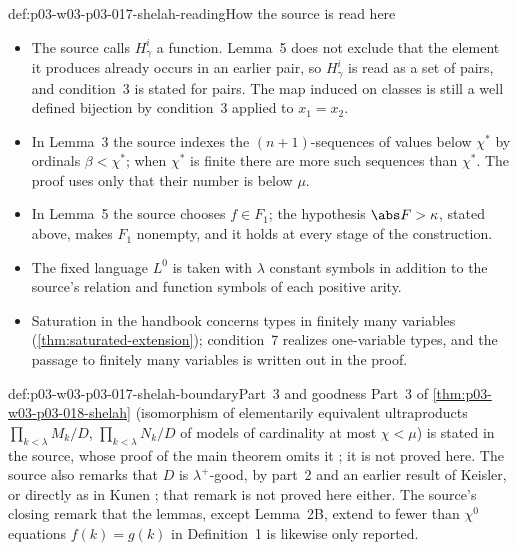 \begin{hbwarning}{def:p03-w03-p03-017-shelah-reading}{How the source is read here}
\begin{itemize}
  \item The source calls \(H^i_\gamma\) a function.  Lemma~5 does not
        exclude that the element it produces already occurs in an earlier
        pair, so \(H^i_\gamma\) is read as a set of pairs, and condition~3
        is stated for pairs.  The map induced on classes is still a well
        defined bijection by condition~3 applied to \(x_1=x_2\).
  \item In Lemma~3 the source indexes the \((n+1)\)-sequences of values
        below \(\chi^*\) by ordinals \(\beta<\chi^*\); when \(\chi^*\) is
        finite there are more such sequences than \(\chi^*\).  The proof
        uses only that their number is below \(\mu\).
  \item In Lemma~5 the source chooses \(f\in F_1\); the hypothesis
        \(\abs F>\kappa\), stated above, makes \(F_1\) nonempty, and it
        holds at every stage of the construction.
  \item The fixed language \(L^0\) is taken with \(\lambda\) constant
        symbols in addition to the source's relation and function symbols
        of each positive arity.
  \item Saturation in the handbook concerns types in finitely many
        variables (\cref{thm:saturated-extension}); condition~7 realizes
        one-variable types, and the passage to finitely many variables is
        written out in the proof.
\end{itemize}
\end{hbwarning}

\begin{proofboundary}{def:p03-w03-p03-017-shelah-boundary}{Part~3 and goodness}
Part~3 of \cref{thm:p03-w03-p03-018-shelah} (isomorphism of elementarily
equivalent ultraproducts \(\prod_{k<\lambda}M_k/D\),
\(\prod_{k<\lambda}N_k/D\) of models of cardinality at most \(\chi<\mu\)) is
stated in the source, whose proof of the main theorem omits it
\cite[p.~230, Remark~2]{Shelah1971Ultrapowers}; it is not proved here.  The
source also remarks that \(D\) is \(\lambda^+\)-good, by part~2 and an
earlier result of Keisler, or directly as in Kunen
\cite[p.~230, Remark~3]{Shelah1971Ultrapowers}; that remark is not proved
here either.  The source's closing remark that the lemmas, except Lemma~2B,
extend to fewer than \(\chi^0\) equations \(f(k)=g(k)\) in Definition~1
\cite[p.~232]{Shelah1971Ultrapowers} is likewise only reported.
\end{proofboundary}

